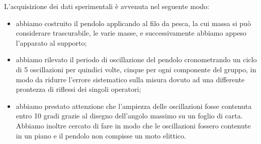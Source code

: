L'acquisizione dei dati sperimentali è avvenuta nel seguente modo:
\begin{itemize}
	\item{abbiamo costruito il pendolo applicando al filo da pesca, la cui massa si può considerare trascurabile, le varie masse, e successivamente abbiamo appeso l'apparato al supporto;}
	\item{abbiamo rilevato il periodo di oscillazione del pendolo cronometrando un ciclo di 5 oscillazioni per quindici volte, cinque per ogni componente del gruppo, in modo da ridurre l'errore sistematico sulla misura dovuto ad una differente prontezza di riflessi dei singoli operatori;}
	\item{abbiamo prestato attenzione che l'ampiezza delle oscillazioni fosse contenuta entro 10 gradi grazie al disegno dell'angolo massimo su un foglio di carta. Abbiamo inoltre cercato di fare in modo che le oscillazioni fossero contenute in un piano e il pendolo non compisse un moto elittico.}
\end{itemize}
